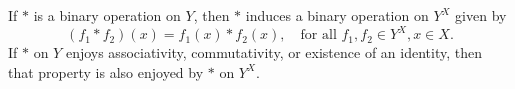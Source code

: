 If $*$ is a binary operation on $Y$, then $*$ induces a binary operation on $Y^X$ given by
$$(f_1 * f_2)(x) = f_1(x) * f_2(x), \quad \text{for all } f_1, f_2 \in Y^X, x \in X.$$
If $*$ on $Y$ enjoys associativity, commutativity, or existence of an identity, then that property is also enjoyed by $*$ on $Y^X$.
